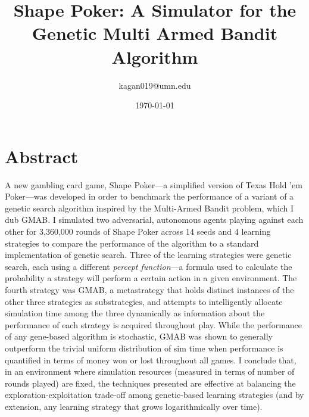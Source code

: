\documentclass[11pt]{article}
\title{Shape Poker: A Simulator for the Genetic Multi Armed Bandit Algorithm}
\author{
kagan019@umn.edu
}
\date{\today}
\begin{document}
\maketitle

\section{Abstract}
A new gambling card game, Shape Poker---a simplified version of Texas Hold 'em Poker---was developed in order to benchmark the performance of a variant of a genetic search algorithm inspired by the Multi-Armed Bandit problem, which I dub GMAB. I simulated two adversarial, autonomous agents playing against each other for 3,360,000 rounds of Shape Poker across 14 seeds and 4 learning strategies to compare the performance of the algorithm to a standard implementation of genetic search. Three of the learning strategies were genetic search, each using a different \textit{percept function}---a formula used to calculate the probability a strategy will perform a certain action in a given environment. The fourth strategy was GMAB, a metastrategy that holds distinct instances of the other three strategies as substrategies, and attempts to intelligently allocate simulation time among the three dynamically as information about the performance of each strategy is acquired throughout play. While the performance of any gene-based algorithm is stochastic, GMAB was shown to generally outperform the trivial uniform distribution of sim time when performance is quantified in terms of money won or lost throughout all games. I conclude that, in an environment where simulation resources (measured in terms of number of rounds played) are fixed, the techniques presented are effective at balancing the exploration-exploitation trade-off among genetic-based learning strategies (and by extension, any learning strategy that grows logarithmically over time).
\end{document}
